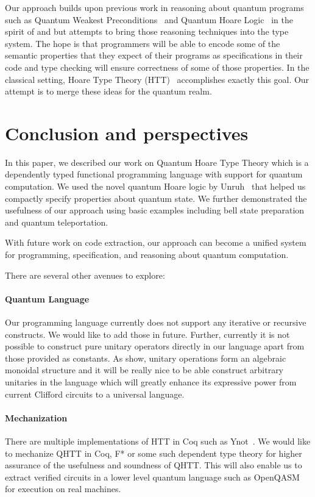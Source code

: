 \documentclass[adraft,creativecommons]{eptcs}
\theoremstyle{definition}
\theoremstyle{remark}
\begin{document}
Our approach builds upon previous work in reasoning about quantum programs such as Quantum Weakest Preconditions~\cite{dhondt2006} and Quantum Hoare Logic~\cite{floydhoare2012} in the spirit of \cite{hoare1969} and \cite{dijkstra1976} but attempts to bring those reasoning techniques into the type system. The hope is that programmers will be able to encode some of the semantic properties that they expect of their programs as specifications in their code and type checking will ensure correctness of some of those properties. In the classical setting, Hoare Type Theory (HTT)~\cite{nanevski2008} accomplishes exactly this goal. Our attempt is to merge these ideas for the quantum realm.

\section{Conclusion and perspectives}
\label{sec:conclusion}
In this paper, we described our work on Quantum Hoare Type Theory which is a dependently typed functional programming language with support for quantum computation. We used the novel quantum Hoare logic by Unruh~\cite{unruh2019} that helped us compactly specify properties about quantum state. We further demonstrated the usefulness of our approach using basic examples including bell state preparation and quantum teleportation.

With future work on code extraction, our approach can become a unified system for programming, specification, and reasoning about quantum computation.

There are several other avenues to explore:

\paragraph{Quantum Language} Our programming language currently does not support any iterative or recursive constructs. We would like to add those in future. Further, currently it is not possible to construct pure unitary operators directly in our language apart from those provided as constants. As \cite{qio} show, unitary operations form an algebraic monoidal structure and it will be really nice to be able construct arbitrary unitaries in the language which will greatly enhance its expressive power from current Clifford circuits to a universal language.

\paragraph{Mechanization} There are multiple implementations of HTT in Coq such as Ynot~\cite{ynot2008}. We would like to mechanize QHTT in Coq, F* or some such dependent type theory for higher assurance of the usefulness and soundness of QHTT. This will also enable us to extract verified circuits in a lower level quantum language such as OpenQASM~\cite{cross2017} for execution on real machines.
\end{document}
